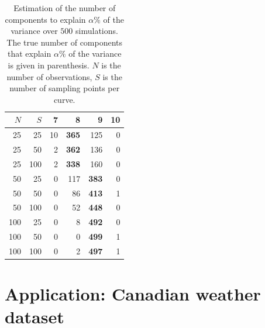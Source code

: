 \documentclass{article}
\newcounter{th}
\begin{document}
\begin{table}
\begin{subtable}[h]{0.45\textwidth}
\begin{tabular}{rr|rrrr}
    $N$ & $S$ & 7 & 8 & 9 & 10\\
    \hline
    25 & 25 & 10 & \textbf{365} & 125 & 0\\
    25 & 50 & 2 & \textbf{362} & 136 & 0\\
    25 & 100 & 2 & \textbf{338} & 160 & 0\\
    50 & 25 & 0 & 117 & \textbf{383} & 0\\
    50 & 50 & 0 & 86 & \textbf{413} & 1\\
    50 & 100 & 0 & 52 & \textbf{448} & 0\\
    100 & 25 & 0 & 8 & \textbf{492} & 0\\
    100 & 50 & 0 & 0 & \textbf{499} & 1\\
    100 & 100 & 0 & 2 & \textbf{497} & 1\\
\end{tabular}
\caption{$\alpha = 99\%$ ($\text{NPC}_{\alpha} = 10$)}
\end{subtable}
\caption{Estimation of the number of components to explain $\alpha\%$ of the variance over $500$ simulations. The true number of components that explain $\alpha\%$ of the variance is given in parenthesis. $N$ is the number of observations, $S$ is the number of sampling points per curve.}
\label{fig:npc_estim}
\end{table}



\section{Application: Canadian weather dataset} %
\label{sec:application_canadian_weather_dataset}
\end{document}
